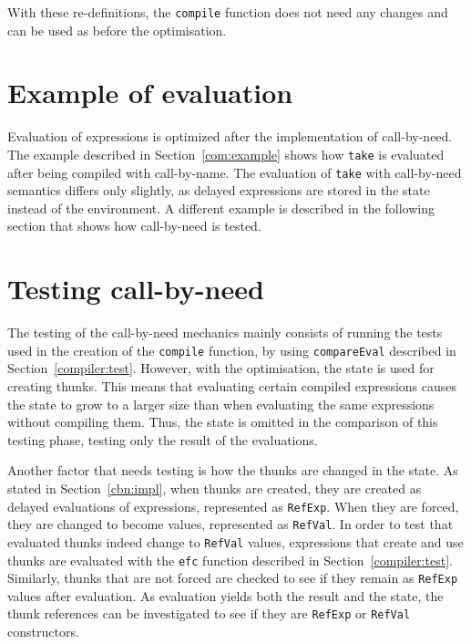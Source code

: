 With these re-definitions, the \texttt{compile} function does not need any
changes and can be used as before the optimisation.

\section{Example of evaluation}
Evaluation of expressions is optimized after the implementation of call-by-need.
The example described in Section~\ref{com:example} shows how \texttt{take} is
evaluated after being compiled with call-by-name. The evaluation of \texttt{take}
with call-by-need semantics differs only slightly, as delayed expressions are
stored in the state instead of the environment. A different example is
described in the following section that shows how call-by-need is tested.

\section{Testing call-by-need}
The testing of the call-by-need mechanics mainly consists of running the tests
used in the creation of the \texttt{compile} function, by using
\texttt{compareEval} described in Section~\ref{compiler:test}. However, with
the optimisation, the state is used for creating thunks. This means that
evaluating certain compiled expressions causes the state to grow to a larger
size than when evaluating the same expressions without compiling them. Thus, the
state is omitted in the comparison of this testing phase, testing only the
result of the evaluations.

Another factor that needs testing is how the thunks are changed in the state.
As stated in Section~\ref{cbn:impl}, when thunks are created, they are created
as delayed evaluations of expressions, represented as \texttt{RefExp}. When they
are forced, they are changed to become values, represented as \texttt{RefVal}.
In order to test that evaluated thunks indeed change to \texttt{RefVal}
values, expressions that create and use thunks are evaluated with the
\texttt{efc} function described in Section~\ref{compiler:test}. Similarly,
thunks that are not forced are checked to see if they remain as
\texttt{RefExp} values after evaluation. As evaluation yields both the result
and the state, the thunk references can be investigated to see if they are
\texttt{RefExp} or \texttt{RefVal} constructors.

